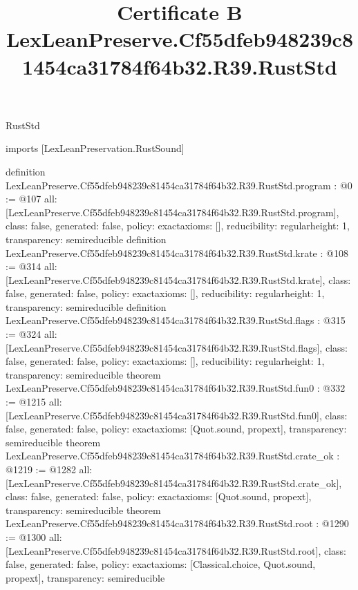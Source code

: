 \begin{lexlean}{RustStd}
\title{Certificate B LexLeanPreserve.Cf55dfeb948239c81454ca31784f64b32.R39.RustStd}
\begin{coremodule}
imports [LexLeanPreservation.RustSound]

definition LexLeanPreserve.Cf55dfeb948239c81454ca31784f64b32.R39.RustStd.program : @0 := @107 {
  all: [LexLeanPreserve.Cf55dfeb948239c81454ca31784f64b32.R39.RustStd.program],
  class: false,
  generated: false,
  policy: exact{axioms: []},
  reducibility: regular{height: 1},
  transparency: semireducible
}
definition LexLeanPreserve.Cf55dfeb948239c81454ca31784f64b32.R39.RustStd.krate : @108 := @314 {
  all: [LexLeanPreserve.Cf55dfeb948239c81454ca31784f64b32.R39.RustStd.krate],
  class: false,
  generated: false,
  policy: exact{axioms: []},
  reducibility: regular{height: 1},
  transparency: semireducible
}
definition LexLeanPreserve.Cf55dfeb948239c81454ca31784f64b32.R39.RustStd.flags : @315 := @324 {
  all: [LexLeanPreserve.Cf55dfeb948239c81454ca31784f64b32.R39.RustStd.flags],
  class: false,
  generated: false,
  policy: exact{axioms: []},
  reducibility: regular{height: 1},
  transparency: semireducible
}
theorem LexLeanPreserve.Cf55dfeb948239c81454ca31784f64b32.R39.RustStd.fun0 : @332 := @1215 {
  all: [LexLeanPreserve.Cf55dfeb948239c81454ca31784f64b32.R39.RustStd.fun0],
  class: false,
  generated: false,
  policy: exact{axioms: [Quot.sound, propext]},
  transparency: semireducible
}
theorem LexLeanPreserve.Cf55dfeb948239c81454ca31784f64b32.R39.RustStd.crate_ok : @1219 := @1282 {
  all: [LexLeanPreserve.Cf55dfeb948239c81454ca31784f64b32.R39.RustStd.crate_ok],
  class: false,
  generated: false,
  policy: exact{axioms: [Quot.sound, propext]},
  transparency: semireducible
}
theorem LexLeanPreserve.Cf55dfeb948239c81454ca31784f64b32.R39.RustStd.root : @1290 := @1300 {
  all: [LexLeanPreserve.Cf55dfeb948239c81454ca31784f64b32.R39.RustStd.root],
  class: false,
  generated: false,
  policy: exact{axioms: [Classical.choice, Quot.sound, propext]},
  transparency: semireducible
}


\end{coremodule}
\end{lexlean}
